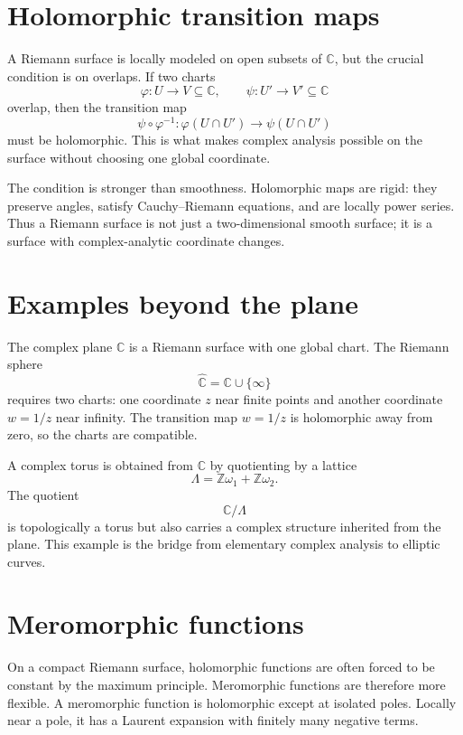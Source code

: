 \section{Holomorphic transition maps}

A Riemann surface is locally modeled on open subsets of \(\mathbb C\), but the crucial condition is on overlaps.  If two charts
\[
  \varphi:U\to V\subseteq\mathbb C,\qquad
  \psi:U'\to V'\subseteq\mathbb C
\]
overlap, then the transition map
\[
  \psi\circ\varphi^{-1}:\varphi(U\cap U')\to\psi(U\cap U')
\]
must be holomorphic.  This is what makes complex analysis possible on the surface without choosing one global coordinate.

The condition is stronger than smoothness.  Holomorphic maps are rigid: they preserve angles, satisfy Cauchy--Riemann equations, and are locally power series.  Thus a Riemann surface is not just a two-dimensional smooth surface; it is a surface with complex-analytic coordinate changes.

\section{Examples beyond the plane}

The complex plane \(\mathbb C\) is a Riemann surface with one global chart.  The Riemann sphere
\[
  \widehat{\mathbb C}=\mathbb C\cup\{\infty\}
\]
requires two charts: one coordinate \(z\) near finite points and another coordinate \(w=1/z\) near infinity.  The transition map \(w=1/z\) is holomorphic away from zero, so the charts are compatible.

A complex torus is obtained from \(\mathbb C\) by quotienting by a lattice
\[
  \Lambda=\mathbb Z\omega_1+\mathbb Z\omega_2.
\]
The quotient
\[
  \mathbb C/\Lambda
\]
is topologically a torus but also carries a complex structure inherited from the plane.  This example is the bridge from elementary complex analysis to elliptic curves.

\section{Meromorphic functions}

On a compact Riemann surface, holomorphic functions are often forced to be constant by the maximum principle.  Meromorphic functions are therefore more flexible.  A meromorphic function is holomorphic except at isolated poles.  Locally near a pole, it has a Laurent expansion with finitely many negative terms.

